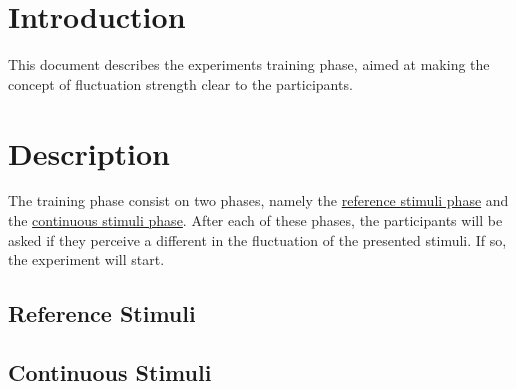 \documentclass[a4paper]{article}
\begin{document}

\section{Introduction} %
\label{sec:introduction}

This document describes the experiment\textquotesingle s training phase, aimed
at making the concept of fluctuation strength clear to the participants.


\section{Description} %
\label{sec:description}

The training phase consist on two phases, namely the
\hyperref[sub:reference_stimuli]{reference stimuli phase} and the
\hyperref[sub:continuous_stimuli]{continuous stimuli phase}. After each of these
phases, the participants will be asked if they perceive a different in the
fluctuation of the presented stimuli. If so, the experiment will start.

\subsection{Reference Stimuli} %
\label{sub:reference_stimuli}


\subsection{Continuous Stimuli} %
\label{sub:continuous_stimuli}


\end{document}
